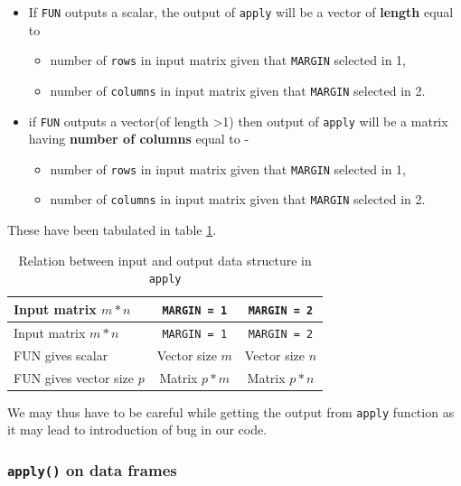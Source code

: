 \documentclass[
]{book}
\providecommand{\tightlist}{%
  \setlength{\itemsep}{0pt}\setlength{\parskip}{0pt}}
\begin{document}
\begin{itemize}
\tightlist
\item
  If \texttt{FUN} outputs a scalar, the output of \texttt{apply} will be a vector of \textbf{length} equal to

  \begin{itemize}
  \tightlist
  \item
    number of \texttt{rows} in input matrix given that \texttt{MARGIN} selected in 1,
  \item
    number of \texttt{columns} in input matrix given that \texttt{MARGIN} selected in 2.
  \end{itemize}
\item
  if \texttt{FUN} outputs a vector(of length \textgreater1) then output of \texttt{apply} will be a matrix having \textbf{number of columns} equal to -

  \begin{itemize}
  \tightlist
  \item
    number of \texttt{rows} in input matrix given that \texttt{MARGIN} selected in 1,
  \item
    number of \texttt{columns} in input matrix given that \texttt{MARGIN} selected in 2.
  \end{itemize}
\end{itemize}

These have been tabulated in table \ref{tab:apply}.

\begin{longtable}[]{@{}lcc@{}}
\caption{\label{tab:apply} Relation between input and output data structure in \texttt{apply}}\tabularnewline
\toprule\noalign{}
Input matrix \(m*n\) & \texttt{MARGIN\ =\ 1} & \texttt{MARGIN\ =\ 2} \\
\midrule\noalign{}
\endfirsthead
\toprule\noalign{}
Input matrix \(m*n\) & \texttt{MARGIN\ =\ 1} & \texttt{MARGIN\ =\ 2} \\
\midrule\noalign{}
\endhead
\bottomrule\noalign{}
\endlastfoot
FUN gives scalar & Vector size \(m\) & Vector size \(n\) \\
FUN gives vector size \(p\) & Matrix \(p*m\) & Matrix \(p*n\) \\
\end{longtable}

We may thus have to be careful while getting the output from \texttt{apply} function as it may lead to introduction of bug in our code.

\hypertarget{apply-on-data-frames}{%
\subsubsection*{\texorpdfstring{\texttt{apply()} on data frames}{apply() on data frames}}\label{apply-on-data-frames}}
\end{document}
